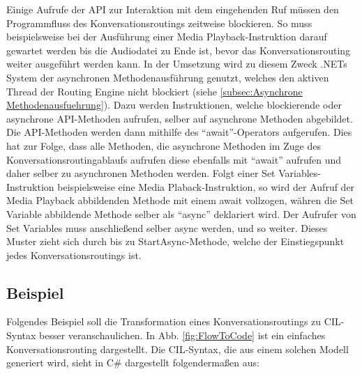 Einige Aufrufe der API zur Interaktion mit dem eingehenden Ruf müssen den Programmfluss des Konversationsroutings zeitweise blockieren. So muss beispielsweise bei der Ausführung einer Media Playback-Instruktion darauf gewartet werden bis die Audiodatei zu Ende ist, bevor das Konversationsrouting weiter ausgeführt werden kann. In der Umsetzung wird zu diesem Zweck .NETs System der asynchronen Methodenausführung genutzt, welches den aktiven Thread der Routing Engine nicht blockiert (siehe \ref{subsec:Asynchrone Methodenausfuehrung}). Dazu werden Instruktionen, welche blockierende oder asynchrone API-Methoden aufrufen, selber auf asynchrone Methoden abgebildet. Die API-Methoden werden dann mithilfe des ``await''-Operators aufgerufen. Dies hat zur Folge, dass alle Methoden, die asynchrone Methoden im Zuge des Konversationsroutingablaufs aufrufen diese ebenfalls mit ``await'' aufrufen und daher selber zu asynchronen Methoden werden. Folgt einer Set Variables-Instruktion beispielsweise eine Media Plaback-Instruktion, so wird der Aufruf der Media Playback abbildenden Methode mit einem await vollzogen, währen die Set Variable abbildende Methode selber als ``async'' deklariert wird. Der Aufrufer von Set Variables muss anschließend selber async werden, und so weiter. Dieses Muster zieht sich durch bis zu StartAsync-Methode, welche der Einstiegspunkt jedes Konversationsroutings ist.

\subsection{Beispiel}
Folgendes Beispiel soll die Transformation eines Konversationsroutings zu CIL-Syntax besser veranschaulichen. In Abb. \ref{fig:FlowToCode} ist ein einfaches Konversationsrouting dargestellt. Die CIL-Syntax, die aus einem solchen Modell generiert wird, sieht in C\# dargestellt folgendermaßen aus:



